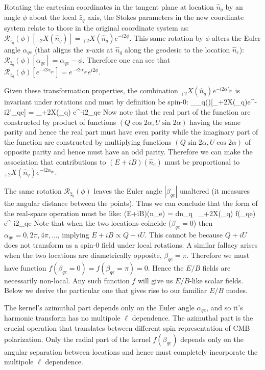 Rotating the cartesian coordinates in the tangent plane at location $\hat{n}_q$ by an angle $\phi$ about the local $\hat{z}_q$ axis, the Stokes parameters in the new coordinate system relate to those in the original coordinate system as:
$\mathcal{R}_{\hat{z}_q}(\phi)[{}_{+2}X(\hat{n}_q)] =  {}_{+2}X(\hat{n}_q) e^{-i2\phi} $.
This same rotation by $\phi$ alters the Euler angle $\alpha_{qe}$ (that aligns the $x$-axis at $\hat{n}_q$ along the geodesic to the location $\hat{n}_e$): $\mathcal{R}_{\hat{z}_q}(\phi)[\alpha_{qe}] = \alpha_{qe} - \phi$.  Therefore one can see that $\mathcal{R}_{\hat{z}_q}(\phi)[e^{-i2\alpha_{qe}}] =  e^{-i2\alpha_{qe}} e^{i2\phi}$.

Given these transformation properties, the combination ${}_{+2}X(\hat{n}_q)e^{-i2\alpha'_{qe}}$ is invariant under rotations and must by definition be spin-0:
\beq
{}_{_q}(\phi)[{}_{+2}X(_q)e^{-i2\alpha'_{qe}}] = {}_{+2}X(_q) e^{-i2\alpha_{qe}}
\eeq
Now note that the real part of the function are constructed by product of functions $(Q\cos{2\alpha}, U\sin{2 \alpha})$ having the same parity and hence the real part must have even parity while the imaginary part of the function are constructed by multiplying functions $(Q\sin{2 \alpha}, U\cos{2\alpha})$ of opposite parity and hence must have an odd parity. Therefore we can make the association that contributions to  $(E+iB)(\hat n_e)$ must be proportional to $ {}_{+2}X(\hat{n}_q) e^{-i2\alpha_{qe}}$.


The same rotation $\mathcal{R}_{\hat{z}_q}(\phi)$ leaves the Euler angle $|\beta_{qe}|$ unaltered (it measures the angular distance between the points).  Thus we can conclude that the form of the real-space operation must be like:
\beq
(E+iB)(\hat n_e) = \int d\hat n_q \  {}_{+2}X(_q) f(\beta_{qe})  e^{-i2\alpha_{qe}}
\eeq
Note that when the two locations coincide ($\beta_{qe}=0$) then  $\alpha_{qe}=0,2\pi,4\pi,\dots$, implying $E + iB \propto Q+iU$.  This cannot be because $Q+iU$ does not transform as a spin-0 field under local rotations. A similar fallacy arises when the two locations are diametrically opposite, $\beta_{qe} = \pi$.  Therefore we must have function $f(\beta_{qe} = 0 ) = f(\beta_{qe} = \pi ) = 0$.  Hence the $E/B$ fields are necessarily non-local.  Any such function $f$ will give us $E/B$-like scalar fields.  Below we derive the particular one that gives rise to our familiar $E/B$ modes.

The kernel's azimuthal part depends only on the Euler angle $\alpha_{qe}$, and so it's harmonic transform has no multipole $\ell$ dependence.  The azimuthal part is the crucial operation that translates between different spin representation of CMB polarization. Only the radial part of the kernel $f(\beta_{qe})$ depends only on the angular separation between locations and hence must completely incorporate the multipole $\ell$ dependence. 

